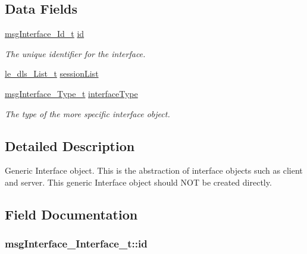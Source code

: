 \subsection*{Data Fields}
\begin{DoxyCompactItemize}
\item 
\hyperlink{structmsg_interface___id__t}{msg\+Interface\+\_\+\+Id\+\_\+t} \hyperlink{structmsg_interface___interface__t_a9fb2cd4505528b30e6fd55de83e40fa3}{id}
\begin{DoxyCompactList}\small\item\em The unique identifier for the interface. \end{DoxyCompactList}\item 
\hyperlink{structle__dls___list__t}{le\+\_\+dls\+\_\+\+List\+\_\+t} \hyperlink{structmsg_interface___interface__t_a626f96166ff7adf4b8627a572194d274}{session\+List}
\item 
\hyperlink{messaging_interface_8h_a4030c9bdeebdff523f6bce9f545e0f58}{msg\+Interface\+\_\+\+Type\+\_\+t} \hyperlink{structmsg_interface___interface__t_ab2c296a242642ead984eda4cc6442436}{interface\+Type}
\begin{DoxyCompactList}\small\item\em The type of the more specific interface object. \end{DoxyCompactList}\end{DoxyCompactItemize}


\subsection{Detailed Description}
Generic Interface object. This is the abstraction of interface objects such as client and server. This generic Interface object should N\+OT be created directly. 

\subsection{Field Documentation}
\subsubsection[{\texorpdfstring{id}{id}}]{ msg\+Interface\+\_\+\+Interface\+\_\+t\+::id}\hypertarget{structmsg_interface___interface__t_a9fb2cd4505528b30e6fd55de83e40fa3}{}\label{structmsg_interface___interface__t_a9fb2cd4505528b30e6fd55de83e40fa3}


